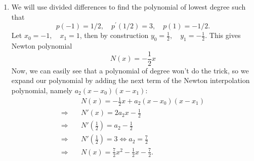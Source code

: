 \begin{enumerate}[ a)]
  \item
We will use divided differences to find the polynomial of lowest degree such that
$$ p(-1)=1 / 2, \quad p^{\prime}(1 / 2)=3, \quad p(1)=-1 / 2. $$
Let $x_0 = -1, \quad x_1=1$, then by construction $y_0=\frac{1}{2}, \quad y_1=-\frac{1}{2}$. This gives Newton polynomial
  $$ N(x) = -\frac{1}{2}x $$
Now, we can easily see that a polynomial of degree won't do the trick, so we expand our polynomial by adding the next term of the Newton interpolation polynomial, namely $a_2(x-x_0)(x-x_1)$:
\begin{align*}
  & N(x) = -\frac{1}{2}x+a_2(x-x_0)(x-x_1) \\
  \Rightarrow \quad & N' \left(x\right)= 2a_2x-\frac{1}{2}  \\
  \Rightarrow \quad & N' \left(\frac{1}{2}\right) = a_2-\frac{1}{2} \\
  \Rightarrow \quad & N' \left(\frac{1}{2}\right) = 3 \Leftrightarrow a_2 = \frac{7}{2} \\
  \Rightarrow \quad & N \left(x\right) = \frac{7}{2}x^2-\frac{1}{2}x-\frac{7}{2}.
\end{align*}

\end{enumerate}


